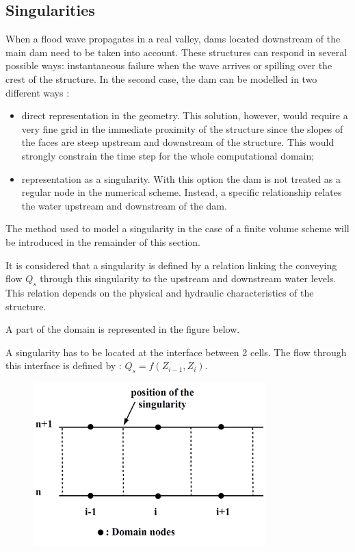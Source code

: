 \subsection{Singularities}

When a flood wave propagates in a real valley, dams located downstream of the main dam need to be taken into account. These structures can respond in several possible ways: instantaneous failure when the wave arrives or spilling over the crest of the structure. In the second case, the dam can be modelled in two different ways :

\begin{itemize}
 \item direct representation in the geometry. This solution, however, would require a very fine grid in the immediate proximity of the structure since the slopes of the faces are steep upstream and downstream of the structure. This would strongly constrain the time step for the whole computational domain;
 \item representation as a singularity. With this option the dam is not treated as a regular node in the numerical scheme. Instead, a specific relationship relates the water upstream and downstream of the dam.
\end{itemize}

The method used to model a singularity in the case of a finite volume scheme will be introduced in the remainder of this section.

It is considered that a singularity is defined by a relation linking the conveying flow $Q_s$ through this singularity to the upstream and downstream water levels. This relation depends on the physical and hydraulic characteristics of the structure.

A part of the domain is represented in the figure below.

A singularity has to be located at the interface between 2 cells. The flow through this interface is defined by : $Q_s = f(Z_{i-1},Z_i)$.

\begin{figure}[H]
    \begin{center}
     \includegraphics[width=0.8\textwidth]{Figures/posSing.png}
    \end{center}
\end{figure}

